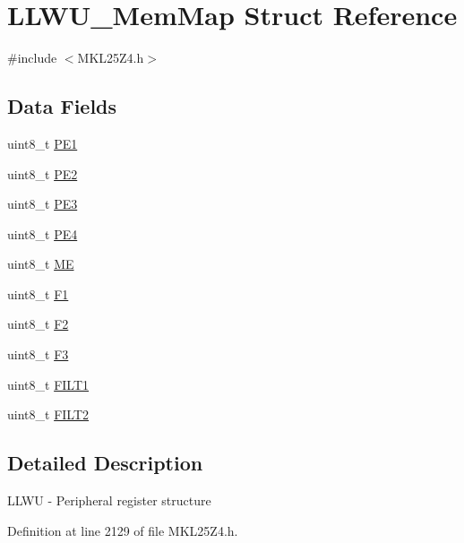 \hypertarget{struct_l_l_w_u___mem_map}{}\section{L\+L\+W\+U\+\_\+\+Mem\+Map Struct Reference}
\label{struct_l_l_w_u___mem_map}


{\ttfamily \#include $<$M\+K\+L25\+Z4.\+h$>$}

\subsection*{Data Fields}
\begin{DoxyCompactItemize}
\item 
uint8\+\_\+t \hyperlink{struct_l_l_w_u___mem_map_abb0c4dd1142a84dc991e6dda4a8381d6}{P\+E1}
\item 
uint8\+\_\+t \hyperlink{struct_l_l_w_u___mem_map_a53d86f5153bce17f9927472da4fade5a}{P\+E2}
\item 
uint8\+\_\+t \hyperlink{struct_l_l_w_u___mem_map_a96a722e1ae66ee87b88407ef622cf243}{P\+E3}
\item 
uint8\+\_\+t \hyperlink{struct_l_l_w_u___mem_map_a61ec3534039e161c5c71ea7f290f23d5}{P\+E4}
\item 
uint8\+\_\+t \hyperlink{struct_l_l_w_u___mem_map_ae8dea688fae93c1a5f9dd22b70cdc5cf}{ME}
\item 
uint8\+\_\+t \hyperlink{struct_l_l_w_u___mem_map_acb7ec83bb70ec1313cd2e0682b1ee75c}{F1}
\item 
uint8\+\_\+t \hyperlink{struct_l_l_w_u___mem_map_a108405432abc40a34ccbb2c0d7ecfdb4}{F2}
\item 
uint8\+\_\+t \hyperlink{struct_l_l_w_u___mem_map_a47d12785dc2fc2afa376e2398c7619f1}{F3}
\item 
uint8\+\_\+t \hyperlink{struct_l_l_w_u___mem_map_a80ad19326e9bf7209c71d7955e4ef044}{F\+I\+L\+T1}
\item 
uint8\+\_\+t \hyperlink{struct_l_l_w_u___mem_map_a84fdf2d8e40d91c4ad620512aaca152b}{F\+I\+L\+T2}
\end{DoxyCompactItemize}


\subsection{Detailed Description}
L\+L\+WU -\/ Peripheral register structure 

Definition at line 2129 of file M\+K\+L25\+Z4.\+h.



